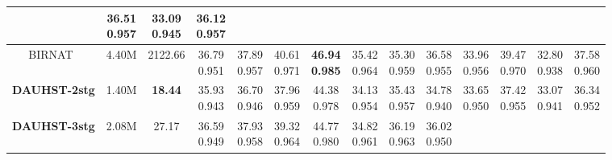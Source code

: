 \documentclass{article}
\begin{document}
\begin{table*}[t]
{\begin{tabular}{cccccccccccccc}
			&\tabincell{c}{36.51\\0.957}
			&\tabincell{c}{33.09\\0.945}
			&\tabincell{c}{36.12\\0.957}
			\\
			\midrule
BIRNAT~\cite{birnat}
			& 4.40M
			& 2122.66
			&\tabincell{c}{36.79\\0.951}
			&\tabincell{c}{37.89\\0.957}
			&\tabincell{c}{40.61\\0.971}
			&\tabincell{c}{\bf{46.94}\\\bf{0.985}}
			&\tabincell{c}{35.42\\0.964}
			&\tabincell{c}{35.30\\0.959}
			&\tabincell{c}{36.58\\0.955}
			&\tabincell{c}{33.96\\0.956}
			&\tabincell{c}{39.47\\0.970}
			&\tabincell{c}{32.80\\0.938}
			&\tabincell{c}{37.58\\0.960}
			\\
			\midrule
			\rowcolor{rouse}
			\bf DAUHST-2stg 
			&  1.40M
			& \bf 18.44
			&\tabincell{c}{35.93\\0.943}
			&\tabincell{c}{36.70\\0.946}
			&\tabincell{c}{37.96\\0.959}
			&\tabincell{c}{44.38\\0.978}
			&\tabincell{c}{34.13\\0.954}
			&\tabincell{c}{35.43\\0.957}
			&\tabincell{c}{34.78\\0.940}
			&\tabincell{c}{33.65\\0.950}
			&\tabincell{c}{37.42\\0.955}
			&\tabincell{c}{33.07\\0.941}
			&\tabincell{c}{36.34\\0.952}
			\\
			\midrule
			\rowcolor{rouse}
			\bf DAUHST-3stg
			& 2.08M
			& 27.17
			&\tabincell{c}{36.59\\0.949}
			&\tabincell{c}{37.93\\0.958}
			&\tabincell{c}{39.32\\0.964}
			&\tabincell{c}{44.77\\0.980}
			&\tabincell{c}{34.82\\0.961}
			&\tabincell{c}{36.19\\0.963}
			&\tabincell{c}{36.02\\0.950}

\end{tabular}}
\end{table*}
\end{document}
